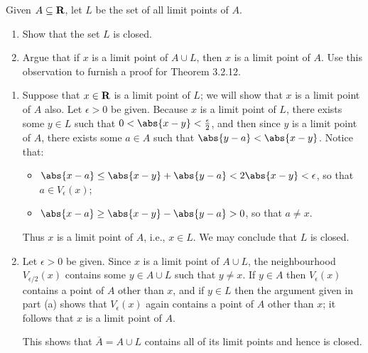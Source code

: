 \documentclass{lew98_solutions}
\begin{document}
\begin{exercise}
\label{ex:3.2.7}
    Given \( A \subseteq \mathbf{R} \), let \( L \) be the set of all limit points of \( A \).
    \begin{enumerate}
        \item Show that the set \( L \) is closed.

        \item Argue that if \( x \) is a limit point of \( A \cup L \), then \( x \) is a limit point of \( A \). Use this observation to furnish a proof for Theorem 3.2.12.
    \end{enumerate}
\end{exercise}

\begin{solution}
    \begin{enumerate}
        \item Suppose that \( x \in \mathbf{R} \) is a limit point of \( L \); we will show that \( x \) is a limit point of \( A \) also. Let \( \epsilon > 0 \) be given. Because \( x \) is a limit point of \( L \), there exists some \( y \in L \) such that \( 0 < \abs{x - y} < \tfrac{\epsilon}{2} \), and then since \( y \) is a limit point of \( A \), there exists some \( a \in A \) such that \( \abs{y - a} < \abs{x - y} \). Notice that:
        \begin{itemize}
            \item \( \abs{x - a} \leq \abs{x - y} + \abs{y - a} < 2 \abs{x - y} < \epsilon \), so that \( a \in V_{\epsilon}(x) \);

            \item \( \abs{x - a} \geq \abs{x - y} - \abs{y - a} > 0 \), so that \( a \neq x \).
        \end{itemize}
        Thus \( x \) is a limit point of \( A \), i.e., \( x \in L \). We may conclude that \( L \) is closed.

        \item Let \( \epsilon > 0 \) be given. Since \( x \) is a limit point of \( A \cup L \), the neighbourhood \( V_{\epsilon/2}(x) \) contains some \( y \in A \cup L \) such that \( y \neq x \). If \( y \in A \) then \( V_{\epsilon}(x) \) contains a point of \( A \) other than \( x \), and if \( y \in L \) then the argument given in part (a) shows that \( V_{\epsilon}(x) \) again contains a point of \( A \) other than \( x \); it follows that \( x \) is a limit point of \( A \).

        This shows that \( \overline{A} = A \cup L \) contains all of its limit points and hence is closed.
    \end{enumerate}
\end{solution}
\end{document}
